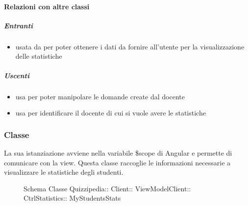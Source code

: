 \paragraph{Relazioni con altre classi}
\subparagraph{Entranti}
\begin{itemize}
\item usata da  per poter ottenere i dati da fornire all'utente per la visualizzazione delle statistiche
\end{itemize}
\subparagraph{Uscenti}
\begin{itemize}
\item usa  per poter manipolare le domande create dal docente
\item usa  per identificare il docente di cui si vuole avere le statistiche
\end{itemize}
\subsubsection{Classe }
La sua istanziazione avviene nella variabile \$scope di Angular e permette di comunicare con la view. Questa classe raccoglie le informazioni necessarie a visualizzare le statistiche degli studenti.
\begin{figure}[H]
\centering
\noindent{}
\caption[Schema Classe MyStudentsStats]{Schema Classe Quizzipedia:: Client:: ViewModelClient:: CtrlStatistics:: MyStudentsStats}
\end{figure}
